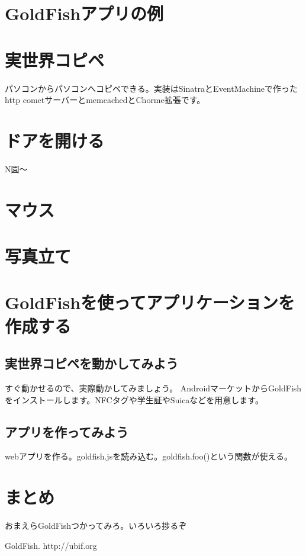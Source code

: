 \section{GoldFishアプリの例}
\section{実世界コピペ}
パソコンからパソコンへコピペできる。実装はSinatraとEventMachineで作ったhttp cometサーバーとmemcachedとChorme拡張です。

\section{ドアを開ける}
N園〜

\section{マウス}

\section{写真立て}


\section{GoldFishを使ってアプリケーションを作成する}
\subsection{実世界コピペを動かしてみよう}
すぐ動かせるので、実際動かしてみましょう。
AndroidマーケットからGoldFishをインストールします。NFCタグや学生証やSuicaなどを用意します。

\subsection{アプリを作ってみよう}
webアプリを作る。goldfish.jsを読み込む。goldfish.foo()という関数が使える。


\section{まとめ}
おまえらGoldFishつかってみろ。いろいろ捗るぞ


\begin{thebibliography}{10}

GoldFish. http://ubif.org

\end{thebibliography}

